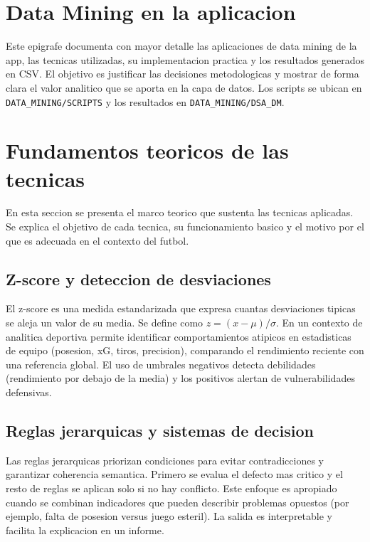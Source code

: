 
\section{Data Mining en la aplicacion}
Este epigrafe documenta con mayor detalle las aplicaciones de data mining de la app, las tecnicas utilizadas, su implementacion practica y los resultados generados en CSV. El objetivo es justificar las decisiones metodologicas y mostrar de forma clara el valor analitico que se aporta en la capa de datos. Los scripts se ubican en \texttt{DATA\_MINING/SCRIPTS} y los resultados en \texttt{DATA\_MINING/DSA\_DM}.

\section{Fundamentos teoricos de las tecnicas}
En esta seccion se presenta el marco teorico que sustenta las tecnicas aplicadas. Se explica el objetivo de cada tecnica, su funcionamiento basico y el motivo por el que es adecuada en el contexto del futbol.

\subsection{Z-score y deteccion de desviaciones}
El z-score es una medida estandarizada que expresa cuantas desviaciones tipicas se aleja un valor de su media. Se define como $z = (x - \mu) / \sigma$. En un contexto de analitica deportiva permite identificar comportamientos atipicos en estadisticas de equipo (posesion, xG, tiros, precision), comparando el rendimiento reciente con una referencia global. El uso de umbrales negativos detecta debilidades (rendimiento por debajo de la media) y los positivos alertan de vulnerabilidades defensivas.

\subsection{Reglas jerarquicas y sistemas de decision}
Las reglas jerarquicas priorizan condiciones para evitar contradicciones y garantizar coherencia semantica. Primero se evalua el defecto mas critico y el resto de reglas se aplican solo si no hay conflicto. Este enfoque es apropiado cuando se combinan indicadores que pueden describir problemas opuestos (por ejemplo, falta de posesion versus juego esteril). La salida es interpretable y facilita la explicacion en un informe.

